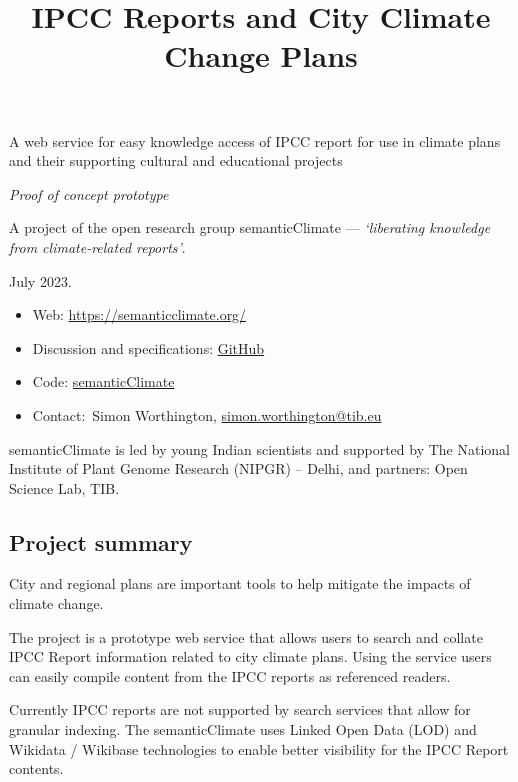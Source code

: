 \documentclass{article}
\begin{document}
\title{IPCC Reports and City Climate Change Plans}

\maketitle


A web service for easy knowledge access of IPCC report for use in climate plans and their supporting cultural and educational projects


\emph{Proof of concept prototype}


A project of the open research group semanticClimate — \emph{‘liberating knowledge from climate-related reports’}.


July 2023. 

\begin{itemize}
\item Web: \href{https://semanticclimate.org/}{https://semanticclimate.org/} 


\item Discussion and specifications: \href{https://github.com/petermr/semanticClimate/discussions/32}{GitHub} 


\item Code: \href{https://github.com/petermr/semanticClimate}{semanticClimate} 


\item Contact: Simon Worthington, \href{mailto:simon.worthington@tib.eu}{simon.worthington@tib.eu} 


\end{itemize}

semanticClimate is led by young Indian scientists and supported by The National Institute of Plant Genome Research (NIPGR) – Delhi, and partners: Open Science Lab, TIB.


\subsection{Project summary}\label{H2966887}



City and regional plans are important tools to help mitigate the impacts of climate change. 


The project is a prototype web service that allows users to search and collate IPCC Report information related to city climate plans. Using the service users can easily compile content from the IPCC reports as referenced readers.


Currently IPCC reports are not supported by search services that allow for granular indexing. The semanticClimate uses Linked Open Data (LOD) and Wikidata / Wikibase technologies to enable better visibility for the IPCC Report contents.
\end{document}
